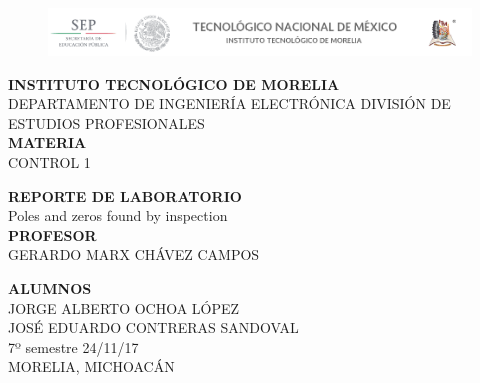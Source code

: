 \documentclass[letterpaper,10pt]{article}
\begin{document}
	
\begin{titlepage}
	\begin{figure}[h!]
		\begin{center}
			\vspace{1.5cm}
			\includegraphics[scale= .5, ]{encabezado.png}
			\label{escudouam1}
			\vspace{-1cm}
		\end{center}
	\end{figure}
	\begin{center}
		\vspace{1cm} 
		\LARGE{\textbf{INSTITUTO TECNOLÓGICO DE MORELIA}} \\
		\vspace{1cm}
		DEPARTAMENTO DE INGENIERÍA ELECTRÓNICA
		DIVISIÓN DE ESTUDIOS PROFESIONALES \\  
		\vspace{2.3cm} {\large \textbf{MATERIA}\\ \LARGE CONTROL 1}
		
		
		\vspace{1.5cm} {\large \textbf{REPORTE DE LABORATORIO}\\ \LARGE Poles and zeros found by inspection}\\ 
		
		\vspace{1.5cm} {\large \textbf{PROFESOR}\\ \LARGE GERARDO MARX CHÁVEZ CAMPOS}
		
		\vspace{1.5cm} {\large \textbf{ALUMNOS}\\ \large JORGE ALBERTO OCHOA LÓPEZ\\JOSÉ EDUARDO CONTRERAS SANDOVAL} \\
		\normalsize{7º semestre
			\hfill {24/11/17}}\\ 
		MORELIA, MICHOACÁN
	\end{center}
\end{titlepage}
\pagebreak
\justify
\tableofcontents
\pagebreak
{}
	
\end{document}
